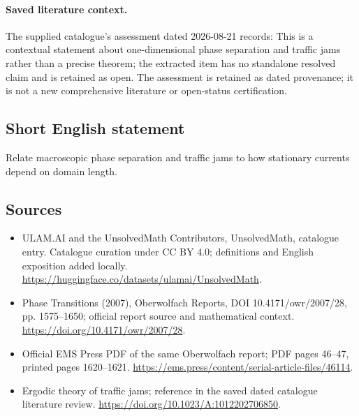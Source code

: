 \documentclass[11pt]{article}
\begin{document}
\paragraph{Saved literature context.} The supplied catalogue's assessment dated 2026-08-21 records: This is a contextual statement about one-dimensional phase separation and traffic jams rather than a precise theorem; the extracted item has no standalone resolved claim and is retained as open. The assessment is retained as dated provenance; it is not a new comprehensive literature or open-status certification.
\subsection{Short English statement}
Relate macroscopic phase separation and traffic jams to how stationary currents depend on domain length.
\subsection{Sources}
\begin{itemize}
\item[\hypertarget{source:statement:1}{S1}] ULAM.AI and the UnsolvedMath Contributors, UnsolvedMath, catalogue entry. Catalogue curation under CC BY 4.0; definitions and English exposition added locally.
\url{https://huggingface.co/datasets/ulamai/UnsolvedMath}.
\item[\hypertarget{source:statement:2}{S2}] Phase Transitions (2007), Oberwolfach Reports, DOI 10.4171/owr/2007/28, pp. 1575--1650; official report source and mathematical context.
\url{https://doi.org/10.4171/owr/2007/28}.
\item[\hypertarget{source:statement:3}{S3}] Official EMS Press PDF of the same Oberwolfach report; PDF pages 46--47, printed pages 1620--1621.
\url{https://ems.press/content/serial-article-files/46114}.
\item[\hypertarget{source:statement:4}{S4}] Ergodic theory of traffic jams; reference in the saved dated catalogue literature review.
\url{https://doi.org/10.1023/A:1012202706850}.
\end{itemize}
\label{end:statement}
\end{document}
